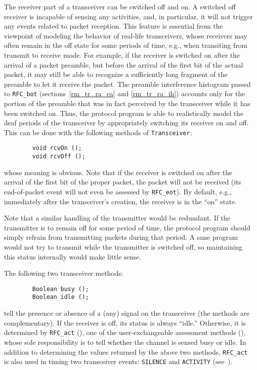 The receiver part of a transceiver can be switched off and on.
A switched off receiver is incapable of sensing any activities,
and, in particular, it will not trigger any events related to packet reception.
This feature is essential from the viewpoint of modeling the
behavior of real-life transceivers, whose receivers may often remain in
the off state for some periods of time, e.g., when transiting from transmit
to receive mode.
For example, if the receiver is switched on after the arrival of a packet
preamble, but before the arrival of the first bit of the actual packet,
it may still be able to recognize a sufficiently long fragment of the
preamble to let it receive the packet.
The preamble interference histogram passed to {\tt RFC\_bot}
(sections~\ref{rm_tr_ra_ea} and \ref{rm_tr_ra_ih}) accounts only for the
portion of the preamble that was in fact perceived by the transceiver
while it has been switched on.
Thus, the protocol program is able to realistically model the deaf
periods of the transceiver by appropriately switching its receiver on and
off.
This can be done with the following methods of {\tt Transceiver}:
\begin{verbatim}
        void rcvOn ();
        void rcvOff ();
\end{verbatim}
\noindent
whose meaning is obvious.
Note that if the receiver is switched on after the arrival of the first bit
of the proper packet, the packet will not be received (its end-of-packet
event will not even be assessed by {\tt RFC\_eot}).
By default, e.g., immediately after the transceiver's creation, the
receiver is in the ``on'' state.

Note that a similar handling of the transmitter would be redundant.
If the transmitter is to remain off for some period of time, the protocol
program should simply refrain from transmitting packets during that period.
A sane program would not try to transmit while the transmitter is switched
off, so maintaining this status internally would make little sense.

The following two transceiver methods:
\begin{verbatim}
        Boolean busy ();
        Boolean idle ();
\end{verbatim}
\noindent
tell the presence or absence of a (any) signal on the transceiver
(the methods are complementary).
If the receiver is off, its status is always ``idle.''
Otherwise, it is determined by {\tt RFC\_act}
(), one of the user-exchangeable
assessment methods (), whose
sole responsibility is to tell whether the channel is sensed busy or idle.
In addition to determining the values returned by the above two methods,
{\tt RFC\_act} is also used in timing two transceiver events:
{\tt SILENCE} and {\tt ACTIVITY} (see~).

